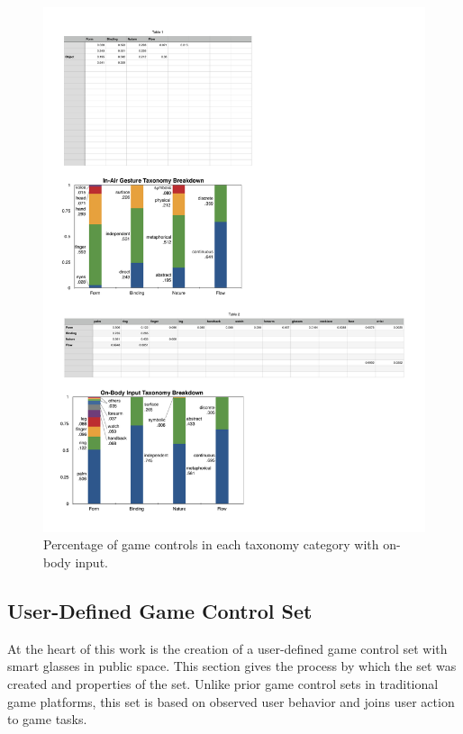 \documentclass{sigchi}
\begin{document}
 \begin{figure}[!h]
  \centering
  \includegraphics[width=1\columnwidth]{OnbodyTaxonomy.pdf}
  \caption{Percentage of game controls in each taxonomy category with on-body input.}
  \label{fig:OnbodyTaxonomy}
  \end{figure} 

  \subsection{User-Defined Game Control Set}
  At the heart of this work is the creation of a user-defined game control set with smart glasses in public space. This section gives the process by which the set was created and properties of the set. Unlike prior game control sets in traditional game platforms, this set is based on observed user behavior and joins user action to game tasks.
\end{document}
